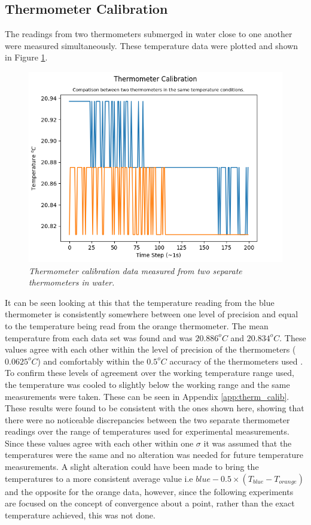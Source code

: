 \documentclass[10pt]{article}
\begin{document}
\subsection*{Thermometer Calibration}
The readings from two thermometers submerged in water close to one another were measured simultaneously. These temperature data were plotted and shown in Figure \ref{fig:therm_calib}.
\begin{figure}[h!]
    \centering
    \includegraphics[scale=0.75]{therm_calib.png}
    \caption{\it{Thermometer calibration data measured from two separate thermometers in water.}}
    \label{fig:therm_calib}
\end{figure}

It can be seen looking at this that the temperature reading from the blue thermometer is consistently somewhere between one level of precision and equal to the temperature being read from the orange thermometer. The mean temperature from each data set was found and was $20.886^oC$ and $20.834^oC$. These values agree with each other within the level of precision of the thermometers ($0.0625^oC$) and comfortably within the $0.5^oC$ accuracy of the thermometers used \cite{thermometer}. To confirm these levels of agreement over the working temperature range used, the temperature was cooled to slightly below the working range and the same measurements were taken. These can be seen in Appendix \ref{app:therm_calib}. These results were found to be consistent with the ones shown here, showing that there were no noticeable discrepancies between the two separate thermometer readings over the range of temperatures used for experimental measurements.
Since these values agree with each other within one $\sigma$ it was assumed that the temperatures were the same and no alteration was needed for future temperature measurements. A slight alteration could have been made to bring the temperatures to a more consistent average value i.e $blue - 0.5\times(T_{blue}-T_{orange})$ and the opposite for the orange data, however, since the following experiments are focused on the concept of convergence about a point, rather than the exact temperature achieved, this was not done.
\end{document}
